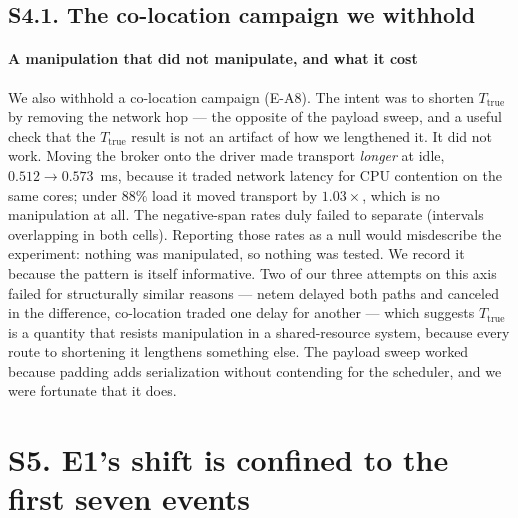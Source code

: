 \documentclass[10pt,journal,onecolumn]{IEEEtran}
\begin{document}
\subsection{S4.1. The co-location campaign we withhold}

\paragraph{A manipulation that did not manipulate, and what it cost} We also withhold a
co-location campaign (E-A8). The intent was to shorten $T_{\mathrm{true}}$ by removing the
network hop --- the opposite of the payload sweep, and a useful check that the
$T_{\mathrm{true}}$ result is not an artifact of how we lengthened it. It did not work. Moving
the broker onto the driver made transport \emph{longer} at idle, $0.512 \to 0.573$~ms, because it
traded network latency for CPU contention on the same cores; under $88\%$ load it moved transport
by $1.03\times$, which is no manipulation at all. The negative-span rates duly failed to separate
(intervals overlapping in both cells). Reporting those rates as a null would misdescribe the
experiment: nothing was manipulated, so nothing was tested. We record it because the pattern is
itself informative. Two of our three attempts on this axis failed for structurally similar
reasons --- netem delayed both paths and canceled in the difference, co-location traded one
delay for another --- which suggests $T_{\mathrm{true}}$ is a quantity that resists manipulation
in a shared-resource system, because every route to shortening it lengthens something else. The
payload sweep worked because padding adds serialization without contending for the scheduler, and
we were fortunate that it does.

\section{S5. E1's shift is confined to the first seven events}
\end{document}
